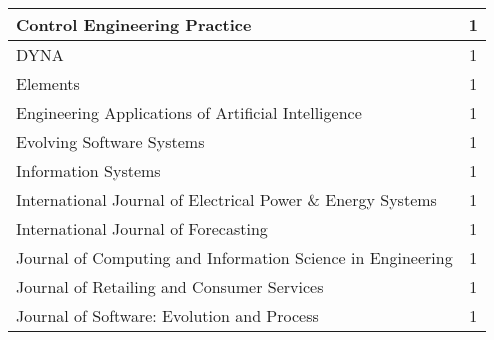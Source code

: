 \begin{longtable}{|p{11cm}|c|}
	Control Engineering Practice                                                                                                                                                            & 1        \\ \hline
	DYNA                                                                                                                                                                                    & 1        \\ \hline
	Elements                                                                                                                                                                                & 1        \\ \hline
	Engineering Applications of Artificial Intelligence                                                                                                                                     & 1        \\ \hline
	Evolving Software Systems                                                                                                                                                               & 1        \\ \hline
	Information Systems                                                                                                                                                                     & 1        \\ \hline
	International Journal of Electrical Power \& Energy Systems                                                                                                                             & 1        \\ \hline
	International Journal of Forecasting                                                                                                                                                    & 1        \\ \hline
	Journal of Computing and Information Science in Engineering                                                                                                                             & 1        \\ \hline
	Journal of Retailing and Consumer Services                                                                                                                                              & 1        \\ \hline
	Journal of Software: Evolution and Process                                                                                                                                              & 1        \\ \hline

\end{longtable}
